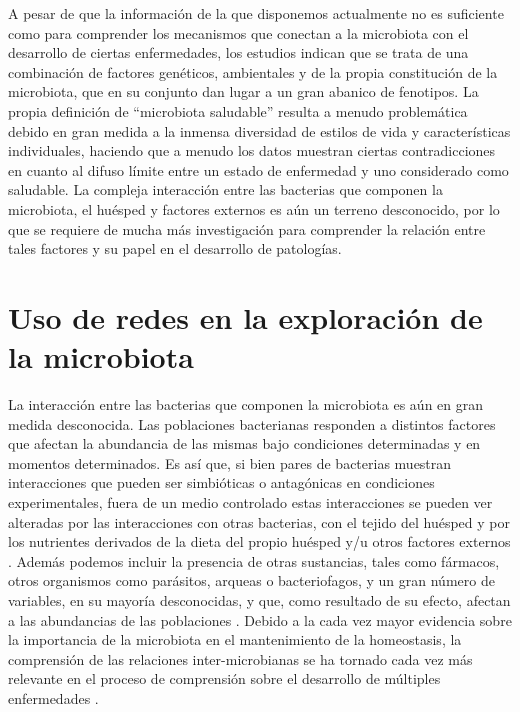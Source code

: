 \documentclass[
]{book}
\begin{document}
A pesar de que la información de la que disponemos actualmente no es suficiente como para comprender los mecanismos que conectan a la microbiota con el desarrollo de ciertas enfermedades, los estudios indican que se trata de una combinación de factores genéticos, ambientales y de la propia constitución de la microbiota, que en su conjunto dan lugar a un gran abanico de fenotipos. La propia definición de ``microbiota saludable'' resulta a menudo problemática debido en gran medida a la inmensa diversidad de estilos de vida y características individuales, haciendo que a menudo los datos muestran ciertas contradicciones en cuanto al difuso límite entre un estado de enfermedad y uno considerado como saludable. La compleja interacción entre las bacterias que componen la microbiota, el huésped y factores externos es aún un terreno desconocido, por lo que se requiere de mucha más investigación para comprender la relación entre tales factores y su papel en el desarrollo de patologías.

\hypertarget{uso-de-redes-en-la-exploraciuxf3n-de-la-microbiota}{%
\section*{Uso de redes en la exploración de la microbiota}\label{uso-de-redes-en-la-exploraciuxf3n-de-la-microbiota}}

La interacción entre las bacterias que componen la microbiota es aún en gran medida desconocida. Las poblaciones bacterianas responden a distintos factores que afectan la abundancia de las mismas bajo condiciones determinadas y en momentos determinados. Es así que, si bien pares de bacterias muestran interacciones que pueden ser simbióticas o antagónicas en condiciones experimentales, fuera de un medio controlado estas interacciones se pueden ver alteradas por las interacciones con otras bacterias, con el tejido del huésped y por los nutrientes derivados de la dieta del propio huésped y/u otros factores externos \citep{layeghifard2017disentangling}. Además podemos incluir la presencia de otras sustancias, tales como fármacos, otros organismos como parásitos, arqueas o bacteriofagos, y un gran número de variables, en su mayoría desconocidas, y que, como resultado de su efecto, afectan a las abundancias de las poblaciones \citep{falony2018richness}. Debido a la cada vez mayor evidencia sobre la importancia de la microbiota en el mantenimiento de la homeostasis, la comprensión de las relaciones inter-microbianas se ha tornado cada vez más relevante en el proceso de comprensión sobre el desarrollo de múltiples enfermedades \citep{rothschild2018environment}.
\end{document}
